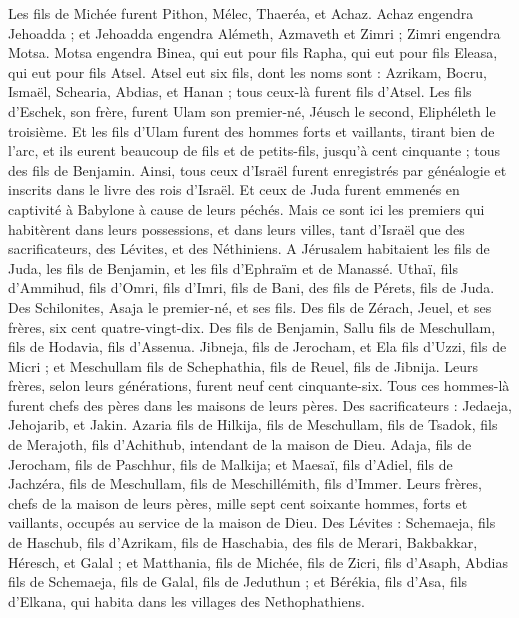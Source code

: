 \begin{multicols}{2}
Les fils de Michée furent Pithon, Mélec, Thaeréa, et Achaz.
Achaz engendra Jehoadda ; et Jehoadda engendra Alémeth, Azmaveth et Zimri ; Zimri engendra Motsa.
Motsa engendra Binea, qui eut pour fils Rapha, qui eut pour fils Eleasa, qui eut pour fils Atsel.
Atsel eut six fils, dont les noms sont : Azrikam, Bocru, Ismaël, Schearia, Abdias, et Hanan ; tous ceux-là furent fils d'Atsel.
Les fils d'Eschek, son frère, furent Ulam son premier-né, Jéusch le second, Eliphéleth le troisième.
Et les fils d'Ulam furent des hommes forts et vaillants, tirant bien de l'arc, et ils eurent beaucoup de fils et de petits-fils, jusqu'à cent cinquante ; tous des fils de Benjamin.
\VerseOne{}Ainsi, tous ceux d'Israël furent enregistrés par généalogie et inscrits dans le livre des rois d'Israël. Et ceux de Juda furent emmenés en captivité à Babylone à cause de leurs péchés.
Mais ce sont ici les premiers qui habitèrent dans leurs possessions, et dans leurs villes, tant d'Israël que des sacrificateurs, des Lévites, et des Néthiniens.
A Jérusalem habitaient les fils de Juda, les fils de Benjamin, et les fils d'Ephraïm et de Manassé.
Uthaï, fils d'Ammihud, fils d'Omri, fils d'Imri, fils de Bani, des fils de Pérets, fils de Juda.
Des Schilonites, Asaja le premier-né, et ses fils.
Des fils de Zérach, Jeuel, et ses frères, six cent quatre-vingt-dix.
Des fils de Benjamin, Sallu fils de Meschullam, fils de Hodavia, fils d'Assenua.
Jibneja, fils de Jerocham, et Ela fils d'Uzzi, fils de Micri ; et Meschullam fils de Schephathia, fils de Reuel, fils de Jibnija.
Leurs frères, selon leurs générations, furent neuf cent cinquante-six. Tous ces hommes-là furent chefs des pères dans les maisons de leurs pères.
Des sacrificateurs : Jedaeja, Jehojarib, et Jakin.
Azaria fils de Hilkija, fils de Meschullam, fils de Tsadok, fils de Merajoth, fils d'Achithub, intendant de la maison de Dieu.
Adaja, fils de Jerocham, fils de Paschhur, fils de Malkija; et Maesaï, fils d'Adiel, fils de Jachzéra, fils de Meschullam, fils de Meschillémith, fils d'Immer.
Leurs frères, chefs de la maison de leurs pères, mille sept cent soixante hommes, forts et vaillants, occupés au service de la maison de Dieu.
Des Lévites : Schemaeja, fils de Haschub, fils d'Azrikam, fils de Haschabia, des fils de Merari,
Bakbakkar, Héresch, et Galal ; et Matthania, fils de Michée, fils de Zicri, fils d'Asaph,
Abdias fils de Schemaeja, fils de Galal, fils de Jeduthun ; et Bérékia, fils d'Asa, fils d'Elkana, qui habita dans les villages des Nethophathiens.

\end{multicols}
